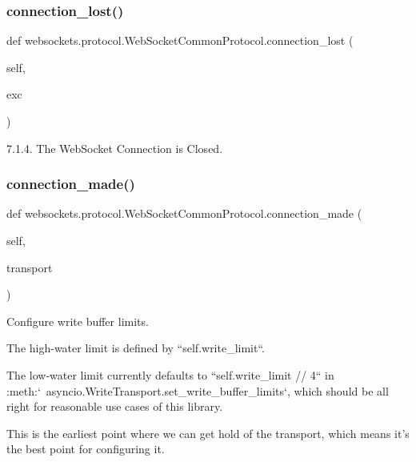 \subsubsection{\texorpdfstring{connection\+\_\+lost()}{connection\_lost()}}
{\footnotesize\ttfamily def websockets.\+protocol.\+Web\+Socket\+Common\+Protocol.\+connection\+\_\+lost (\begin{DoxyParamCaption}\item[{}]{self,  }\item[{}]{exc }\end{DoxyParamCaption})}

\begin{DoxyVerb}7.1.4. The WebSocket Connection is Closed.\end{DoxyVerb}
 \mbox{\label{classwebsockets_1_1protocol_1_1_web_socket_common_protocol_a8b650d7fe663c9465e7fc027689cad4e}} 
\subsubsection{\texorpdfstring{connection\+\_\+made()}{connection\_made()}}
{\footnotesize\ttfamily def websockets.\+protocol.\+Web\+Socket\+Common\+Protocol.\+connection\+\_\+made (\begin{DoxyParamCaption}\item[{}]{self,  }\item[{}]{transport }\end{DoxyParamCaption})}

\begin{DoxyVerb}Configure write buffer limits.

The high-water limit is defined by ``self.write_limit``.

The low-water limit currently defaults to ``self.write_limit // 4`` in
:meth:`~asyncio.WriteTransport.set_write_buffer_limits`, which should
be all right for reasonable use cases of this library.

This is the earliest point where we can get hold of the transport,
which means it's the best point for configuring it.\end{DoxyVerb}
 \mbox{\label{classwebsockets_1_1protocol_1_1_web_socket_common_protocol_aae85117dc05aa48fa6de503bab27fef5}} 
